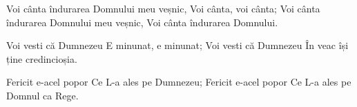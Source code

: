 \beginchorus
Voi cânta îndurarea Domnului meu veșnic,
Voi cânta, voi cânta;
Voi cânta îndurarea Domnului meu veșnic,
Voi cânta îndurarea Domnului.
\endchorus

\beginverse
Voi vesti că Dumnezeu
E minunat, e minunat;
Voi vesti că Dumnezeu
În veac își ține credincioșia.
\endverse

\beginverse
Fericit e-acel popor
Ce L-a ales pe Dumnezeu;
Fericit e-acel popor
Ce L-a ales pe Domnul ca Rege.
\endverse
\endsong